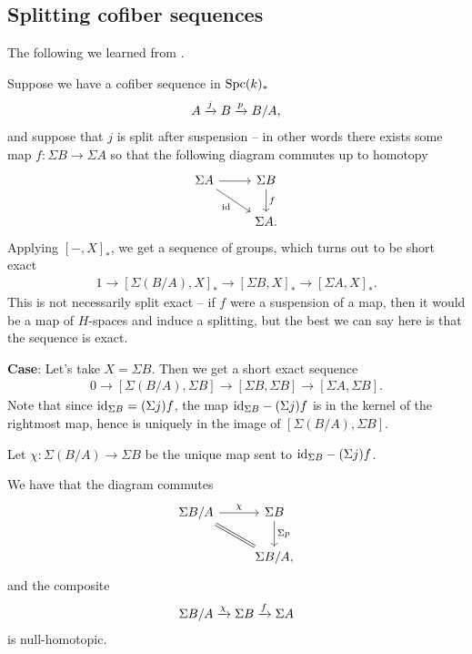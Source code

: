 \documentclass[11pt,openany]{book}
\begin{document}
\subsection{Splitting cofiber sequences}

The following we learned from \cite[Appendix~A]{DI-Hopf}.

Suppose we have a cofiber sequence in $\mathrm{Spc}(k)_\ast$
\begin{align*}
    A \xrightarrow{j} B \xrightarrow{p} B/A,
\end{align*}
and suppose that $j$ is split after suspension -- in other words there exists some map $f \colon \Sigma B \to \Sigma A$ so that the following diagram commutes up to homotopy
\[ \begin{tikzcd}
    \Sigma A\ar[dr,"\id" below left]\rar & \Sigma B\dar["f" right]\\
     & \Sigma A.
\end{tikzcd} \]
Applying $\left[ -,X \right]_\ast$, we get a sequence of groups, which turns out to be short exact
\begin{align*}
    1 \to \left[ \Sigma(B/A),X \right]_\ast \to \left[ \Sigma B, X \right]_\ast \to \left[ \Sigma A, X \right]_\ast.
\end{align*}
This is not necessarily split exact -- if $f$ were a suspension of a map, then it would be a map of $H$-spaces and induce a splitting, but the best we can say here is that the sequence is exact.

\textbf{Case}: Let's take $X = \Sigma B$. Then we get a short exact sequence
\begin{align*}
    0 \to \left[ \Sigma(B/A), \Sigma B \right] \to \left[ \Sigma B, \Sigma B \right] \to \left[ \Sigma A, \Sigma B \right].
\end{align*}
Note that since $\mathrm{id}_{\Sigma B} = (\Sigma j) f$, the map $\mathrm{id}_{\Sigma B} - (\Sigma j)f$ is in the kernel of the rightmost map, hence is uniquely in the image of $\left[ \Sigma(B/A), \Sigma B \right]$.

Let $\chi \colon \Sigma (B/A) \to \Sigma B$ be the unique map sent to $\mathrm{id}_{\Sigma B} - (\Sigma j)f$.

\begin{lemma} \cite[A.3]{DI-Hopf} We have that the diagram commutes
\[ \begin{tikzcd}
    \Sigma B/A\rar["\chi" above]\ar[dr,equal] & \Sigma B\dar["\Sigma p" right]\\
     & \Sigma B/A,
\end{tikzcd} \]
and the composite
\begin{align*}
    \Sigma B/A \xrightarrow{\chi} \Sigma B \xrightarrow{f} \Sigma A
\end{align*}
is null-homotopic.
\end{lemma}
\end{document}

